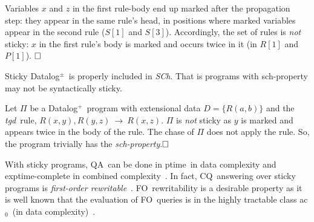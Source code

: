 \documentclass[format=acmsmall, review=false, screen=true]{acmart}
\newcommand{\ignoreT}[1]{}
\newcommand{\cq}{CQ}
\newcommand{\boxtheorem}{\ensuremath{\hfill \Box}}
\newcommand{\mc}[1]{\mathcal{ #1}}
\newcommand{\nit}[1]{{\it #1}}
\newcommand{\dpm}{{Datalog}$^\pm$}
\newcommand{\prg}{\Pi}
\newcommand{\dplus}{{Datalog}$^+$}
\newcommand{\m}{\;\!\!}
\newcommand{\SCh}{{\em S\m{}Ch}}
\newcommand{\qa}{QA}
\newcommand{\fo}{FO}
\newcommand{\exptime}{{\sc exptime}}
\newcommand{\ptime}{{\sc ptime}}
\newcommand{\acz}{{\sc ac}$_0$}
\newcommand{\tgd}{{\em tgd}}
\begin{document}
{{Variables  $x$ and $z$ in the first rule-body end up marked  after the propagation step: they appear in the same rule's head, in positions where marked variables appear in the second rule ($S[1]$ and $S[3]$). Accordingly, the set of rules is {\em not} sticky: $x$ in the first rule's body is marked and occurs twice in it (in $R[1]$ and $P[1]$). \boxtheorem

Sticky \dpm \ is properly included in \SCh. That is programs with sch-property may not be syntactically sticky.

\begin{example} \label{ex:sch-non-sticky} Let $\prg$ be a \dplus \ program with extensional data $D=\{R(a,b)\}$ and the \tgd \ rule, $R(x,y),R(y,z)~\rightarrow~R(x,z)$. $\prg$ is {\em not} sticky as $y$ is marked and appears twice in the body of the rule. The chase of $\prg$ does not apply the rule. So, the program trivially has the {\em sch-property}.\boxtheorem\end{example}

With sticky programs, \qa \ can be done in \ptime \ in data complexity and \exptime-complete in combined complexity~\cite{cali12}. In fact, \cq \ answering over sticky programs is {\em first-order rewritable}~\cite{cali10vldb,gottlob11}. \fo \ rewritability is a desirable property as it is well known that the evaluation of \fo \ queries is in the highly tractable class \acz \ (in data complexity)~\cite{vardi}.






}}
\end{document}
